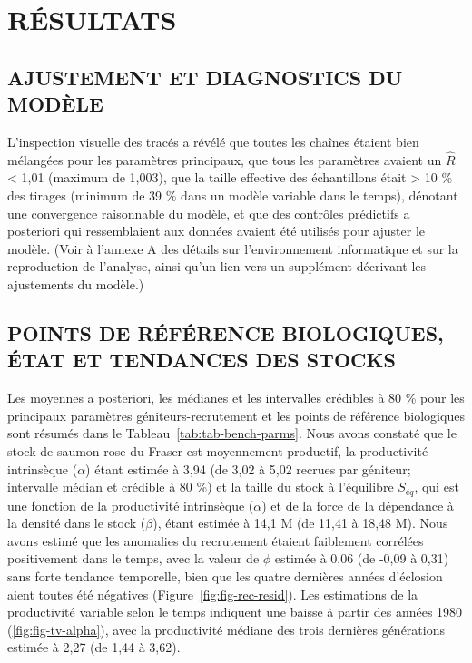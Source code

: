 \documentclass[french,11pt]{book}
\begin{document}
\hypertarget{ruxe9sultats}{%
\section{RÉSULTATS}\label{ruxe9sultats}}

\hypertarget{ajustement-et-diagnostics-du-moduxe8le-1}{%
\subsection{AJUSTEMENT ET DIAGNOSTICS DU MODÈLE}\label{ajustement-et-diagnostics-du-moduxe8le-1}}

L'inspection visuelle des tracés a révélé que toutes les chaînes étaient bien mélangées pour les paramètres principaux, que tous les paramètres avaient un \(\hat{R}\) \textless{} 1,01 (maximum de 1,003), que la taille effective des échantillons était \textgreater{} 10 \% des tirages (minimum de 39 \% dans un modèle variable dans le temps), dénotant une convergence raisonnable du modèle, et que des contrôles prédictifs a posteriori qui ressemblaient aux données avaient été utilisés pour ajuster le modèle. (Voir à l'annexe A des détails sur l'environnement informatique et sur la reproduction de l'analyse, ainsi qu'un lien vers un supplément décrivant les ajustements du modèle.)

\hypertarget{points-de-ruxe9fuxe9rence-biologiques-uxe9tat-et-tendances-des-stocks}{%
\subsection{POINTS DE RÉFÉRENCE BIOLOGIQUES, ÉTAT ET TENDANCES DES STOCKS}\label{points-de-ruxe9fuxe9rence-biologiques-uxe9tat-et-tendances-des-stocks}}

Les moyennes a posteriori, les médianes et les intervalles crédibles à 80 \% pour les principaux paramètres géniteurs-recrutement et les points de référence biologiques sont résumés dans le Tableau~\ref{tab:tab-bench-parms}. Nous avons constaté que le stock de saumon rose du Fraser est moyennement productif, la productivité intrinsèque (\(\alpha\)) étant estimée à 3,94 (de 3,02 à 5,02 recrues par géniteur; intervalle médian et crédible à 80 \%) et la taille du stock à l'équilibre \(S_{éq}\), qui est une fonction de la productivité intrinsèque (\(\alpha\)) et de la force de la dépendance à la densité dans le stock (\(\beta\)), étant estimée à 14,1 M (de 11,41 à 18,48 M). Nous avons estimé que les anomalies du recrutement étaient faiblement corrélées positivement dans le temps, avec la valeur de \(\phi\) estimée à 0,06 (de -0,09 à 0,31) sans forte tendance temporelle, bien que les quatre dernières années d'éclosion aient toutes été négatives (Figure~\ref{fig:fig-rec-resid}). Les estimations de la productivité variable selon le temps indiquent une baisse à partir des années 1980 (\ref{fig:fig-tv-alpha}), avec la productivité médiane des trois dernières générations estimée à 2,27 (de 1,44 à 3,62).
\end{document}
